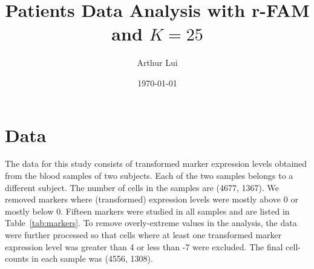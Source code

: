\documentclass[11pt]{article} %
\title{Patients Data Analysis with r-FAM and $K=25$}
\author{Arthur Lui}
\date{\today} %
\begin{document}
\maketitle



\section{Data}\label{sec:data}
The data for this study consists of transformed marker expression levels
obtained from the blood samples of two subjects. Each of the two samples
belongs to a different subject. The number of cells in the samples are (4677,
1367). We removed markers where (transformed) expression levels were mostly
above 0 or mostly below 0. Fifteen markers were studied in all samples and
are listed in Table~\ref{tab:markers}. To remove overly-extreme values in the
analysis, the data were further processed so that cells where at least one
transformed marker expression level was greater than 4 or less than -7 were
excluded. The final cell-counts in each sample was (4556, 1308).

\end{document}

